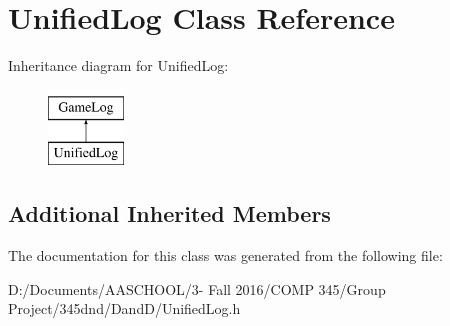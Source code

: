\hypertarget{class_unified_log}{}\section{Unified\+Log Class Reference}
\label{class_unified_log}
Inheritance diagram for Unified\+Log\+:\begin{figure}[H]
\begin{center}
\leavevmode
\includegraphics[height=2.000000cm]{class_unified_log}
\end{center}
\end{figure}
\subsection*{Additional Inherited Members}


The documentation for this class was generated from the following file\+:\begin{DoxyCompactItemize}
\item 
D\+:/\+Documents/\+A\+A\+S\+C\+H\+O\+O\+L/3-\/ Fall 2016/\+C\+O\+M\+P 345/\+Group Project/345dnd/\+Dand\+D/Unified\+Log.\+h\end{DoxyCompactItemize}
